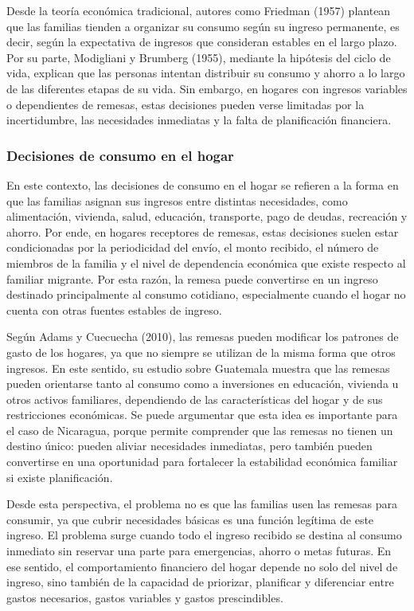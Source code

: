\documentclass[12pt,letterpaper]{article}
\begin{document}
Desde la teoría económica tradicional, autores como Friedman (1957) plantean que las familias tienden a organizar su consumo según su ingreso permanente, es decir, según la expectativa de ingresos que consideran estables en el largo plazo. Por su parte, Modigliani y Brumberg (1955), mediante la hipótesis del ciclo de vida, explican que las personas intentan distribuir su consumo y ahorro a lo largo de las diferentes etapas de su vida. Sin embargo, en hogares con ingresos variables o dependientes de remesas, estas decisiones pueden verse limitadas por la incertidumbre, las necesidades inmediatas y la falta de planificación financiera.

\subsubsection{\texorpdfstring{\textbf{Decisiones de consumo en el hogar}}{Decisiones de consumo en el hogar}}\label{decisiones-de-consumo-en-el-hogar}

En este contexto, las decisiones de consumo en el hogar se refieren a la forma en que las familias asignan sus ingresos entre distintas necesidades, como alimentación, vivienda, salud, educación, transporte, pago de deudas, recreación y ahorro. Por ende, en hogares receptores de remesas, estas decisiones suelen estar condicionadas por la periodicidad del envío, el monto recibido, el número de miembros de la familia y el nivel de dependencia económica que existe respecto al familiar migrante. Por esta razón, la remesa puede convertirse en un ingreso destinado principalmente al consumo cotidiano, especialmente cuando el hogar no cuenta con otras fuentes estables de ingreso.

Según Adams y Cuecuecha (2010), las remesas pueden modificar los patrones de gasto de los hogares, ya que no siempre se utilizan de la misma forma que otros ingresos. En este sentido, su estudio sobre Guatemala muestra que las remesas pueden orientarse tanto al consumo como a inversiones en educación, vivienda u otros activos familiares, dependiendo de las características del hogar y de sus restricciones económicas. Se puede argumentar que esta idea es importante para el caso de Nicaragua, porque permite comprender que las remesas no tienen un destino único: pueden aliviar necesidades inmediatas, pero también pueden convertirse en una oportunidad para fortalecer la estabilidad económica familiar si existe planificación.

Desde esta perspectiva, el problema no es que las familias usen las remesas para consumir, ya que cubrir necesidades básicas es una función legítima de este ingreso. El problema surge cuando todo el ingreso recibido se destina al consumo inmediato sin reservar una parte para emergencias, ahorro o metas futuras. En ese sentido, el comportamiento financiero del hogar depende no solo del nivel de ingreso, sino también de la capacidad de priorizar, planificar y diferenciar entre gastos necesarios, gastos variables y gastos prescindibles.
\end{document}
